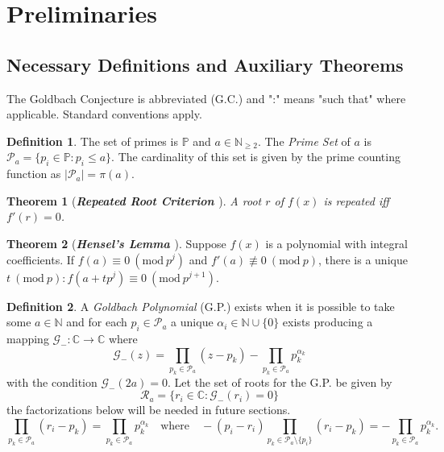 \documentclass[12pt,a4paper]{amsart}
\numberwithin{equation}{section}
\theoremstyle{theorem}
\theoremstyle{definition}
\newtheorem{definition}{Definition}
\newtheorem{theorem}{Theorem}
\theoremstyle{remark}
\theoremstyle{con}
\newcommand{\Mod}[1]{\ (\mathrm{mod}\ #1)}
\begin{document}
\section{Preliminaries}


\subsection{Necessary Definitions and Auxiliary Theorems}\label{pre}

The Goldbach Conjecture is abbreviated (G.C.) and ":" means "such that" where applicable. Standard conventions apply.

\begin{definition}\label{pset}
The set of primes is $\mathbb{P}$ and $a \in \mathbb{N}_{\geq 2}$. The \textit{Prime Set} of $a$ is $\mathcal{P}_a = \{p_i \in \mathbb{P} : p_i \leq a \}$. The cardinality of this set is given by the prime counting function as $|\mathcal{P} _a| = \pi(a)$.
\end{definition}

\begin{theorem}[\bf\textit{Repeated Root Criterion \cite{dummit2004}}]\label{repeated}
\textit{A root $r$ of $f(x)$ is repeated iff $f'(r) = 0$.}
\end{theorem}

\begin{theorem}[\bf\textit{Hensel's Lemma \cite{Z}}]\label{HL}
Suppose $f(x)$ is a polynomial with integral coefficients. If $f(a) \equiv 0 \Mod{p^j}$ and $f'(a) \not \equiv 0 \Mod{p}$, there is a unique $t \Mod{p} : f(a + tp^j) \equiv 0 \Mod{p^{j + 1}}$.
\end{theorem}



 


\begin{definition}\label{polyx}
A \textit{Goldbach Polynomial} (G.P.) exists when it is possible to take some $a \in \mathbb{N}$ and for each $p_i \in \mathcal{P}_a$ a unique $\alpha_i \in \mathbb{N} \cup \{0\}$ exists producing a mapping $\mathcal{G}_- : \mathbb{C} \to \mathbb{C}$ where  
\begin{equation}\label{roots}
 \mathcal{G}_-(z) = \prod_{p_k \in \mathcal{P}_a} (z - p_k) - \prod_{p_k \in \mathcal{P}_a}p_k^{\alpha_k}
 \end{equation}
 with the condition $\mathcal{G}_-(2a) = 0$. Let the set of roots for the G.P. be given by 
\begin{equation}\label{R}
\mathcal{R}_a = \{ r_i \in \mathbb{C} : \mathcal{G}_-(r_i) = 0 \}
\end{equation}
the factorizations below will be needed in future sections. 
 \begin{equation}\label{factor1}
 \prod_{p_k \in \mathcal{P}_a}(r_i - p_k) = \prod_{p_k \in \mathcal{P}_a}p_k^{\alpha_k} \quad \text{where} \quad -(p_i - r_i) \prod_{p_k \in \mathcal{P}_a \setminus\{p_i\}}(r_i - p_k) = -\prod_{p_k \in \mathcal{P}_a}p_k^{\alpha_k}.
 \end{equation}
\end{definition}
\end{document}
